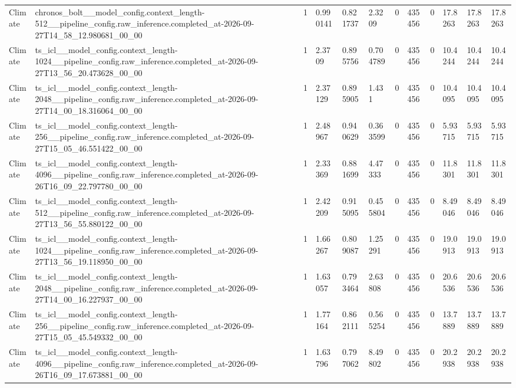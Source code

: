\begin{tabular}{llllllllllll}
Climate & chronos\_bolt\_\_model\_config.context\_length-512\_\_pipeline\_config.raw\_inference.completed\_at-2026-09-27T14\_58\_12.980681\_00\_00 & 1 & 0.990141 & 0.821737 & 2.3209 & 0 & 435456 & 0 & 17.8263 & 17.8263 & 17.8263 \\
Climate & ts\_icl\_\_model\_config.context\_length-1024\_\_pipeline\_config.raw\_inference.completed\_at-2026-09-27T13\_56\_20.473628\_00\_00 & 1 & 2.3709 & 0.895756 & 0.704789 & 0 & 435456 & 0 & 10.4244 & 10.4244 & 10.4244 \\
Climate & ts\_icl\_\_model\_config.context\_length-2048\_\_pipeline\_config.raw\_inference.completed\_at-2026-09-27T14\_00\_18.316064\_00\_00 & 1 & 2.37129 & 0.895905 & 1.431 & 0 & 435456 & 0 & 10.4095 & 10.4095 & 10.4095 \\
Climate & ts\_icl\_\_model\_config.context\_length-256\_\_pipeline\_config.raw\_inference.completed\_at-2026-09-27T15\_05\_46.551422\_00\_00 & 1 & 2.48967 & 0.940629 & 0.363599 & 0 & 435456 & 0 & 5.93715 & 5.93715 & 5.93715 \\
Climate & ts\_icl\_\_model\_config.context\_length-4096\_\_pipeline\_config.raw\_inference.completed\_at-2026-09-26T16\_09\_22.797780\_00\_00 & 1 & 2.33369 & 0.881699 & 4.47333 & 0 & 435456 & 0 & 11.8301 & 11.8301 & 11.8301 \\
Climate & ts\_icl\_\_model\_config.context\_length-512\_\_pipeline\_config.raw\_inference.completed\_at-2026-09-27T13\_56\_55.880122\_00\_00 & 1 & 2.42209 & 0.915095 & 0.455804 & 0 & 435456 & 0 & 8.49046 & 8.49046 & 8.49046 \\
Climate & ts\_icl\_\_model\_config.context\_length-1024\_\_pipeline\_config.raw\_inference.completed\_at-2026-09-27T13\_56\_19.118950\_00\_00 & 1 & 1.66267 & 0.809087 & 1.25291 & 0 & 435456 & 0 & 19.0913 & 19.0913 & 19.0913 \\
Climate & ts\_icl\_\_model\_config.context\_length-2048\_\_pipeline\_config.raw\_inference.completed\_at-2026-09-27T14\_00\_16.227937\_00\_00 & 1 & 1.63057 & 0.793464 & 2.63808 & 0 & 435456 & 0 & 20.6536 & 20.6536 & 20.6536 \\
Climate & ts\_icl\_\_model\_config.context\_length-256\_\_pipeline\_config.raw\_inference.completed\_at-2026-09-27T15\_05\_45.549332\_00\_00 & 1 & 1.77164 & 0.862111 & 0.565254 & 0 & 435456 & 0 & 13.7889 & 13.7889 & 13.7889 \\
Climate & ts\_icl\_\_model\_config.context\_length-4096\_\_pipeline\_config.raw\_inference.completed\_at-2026-09-26T16\_09\_17.673881\_00\_00 & 1 & 1.63796 & 0.797062 & 8.49802 & 0 & 435456 & 0 & 20.2938 & 20.2938 & 20.2938 \\

\end{tabular}
